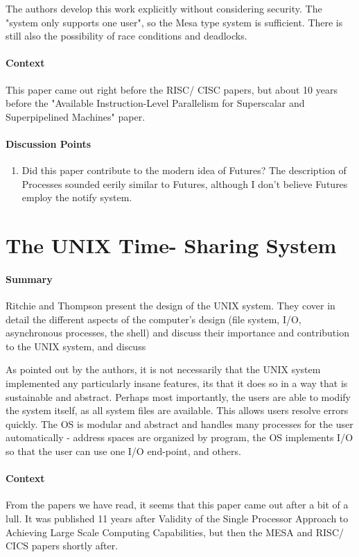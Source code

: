 The authors develop this work explicitly without considering security. The
"system only supports one user", so the Mesa type system is sufficient. There is
still also the possibility of race conditions and deadlocks.
\paragraph{\textbf{Context}}
This paper came out right before the RISC/ CISC papers, but about 10 years
before the "Available Instruction-Level Parallelism for Superscalar and
Superpipelined Machines" paper.
\paragraph{\textbf{Discussion Points}}
\begin{enumerate}
    \item Did this paper contribute to the modern idea of Futures? The
    description of Processes sounded eerily similar to Futures, although I don't
    believe Futures employ the notify system.    
\end{enumerate}

\section {The UNIX Time- Sharing System \cite{ritchie1978unix}}

\paragraph{\textbf{Summary}}
Ritchie and Thompson present the design of the UNIX system. They cover in detail
the different aspects of the computer's design (file system, I/O, asynchronous
processes, the shell) and discuss their importance and contribution to the UNIX
system, and discuss

As pointed out by the authors, it is not necessarily that the UNIX system
implemented any particularly insane features, its that it does so in a way that
is sustainable and abstract. Perhaps most importantly, the users are able to
modify the system itself, as all system files are available. This allows users
resolve errors quickly. The OS is modular and abstract and handles many
processes for the user automatically - address spaces are organized by program,
the OS implements I/O so that the user can use one I/O end-point, and others.

\paragraph{\textbf{Context}}
From the papers we have read, it seems that this paper came out after a bit of a
lull. It was published 11 years after Validity of the Single Processor Approach
to Achieving Large Scale Computing Capabilities, but then the MESA and RISC/
CICS papers shortly after.


